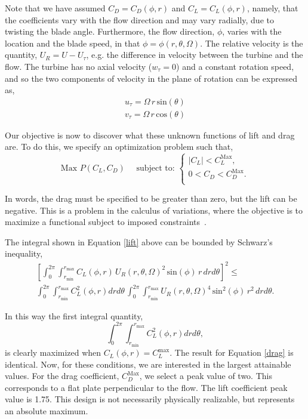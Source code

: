 Note that we have assumed $C_D = C_D(\phi,r)$ and $C_L = C_L(\phi,r)$,
namely, that the coefficients vary with the flow direction and may vary
radially, due to twisting the blade angle. Furthermore, the flow
direction, $\phi$, varies with the location and the blade speed,
in that $\phi=\phi(r,\theta,\Omega)$. The relative velocity is the
quantity, $U_R = U - U_\tau$, e.g. the difference in velocity between
the turbine and the flow. The turbine has no axial velocity ($w_\tau =
0$) and a constant rotation speed, and so the two components of velocity
in the plane of rotation can be expressed as,
\begin{align}
 u_\tau = \Omega \,r\, \text{sin}(\theta)\\
 v_\tau = \Omega \,r\, \text{cos}(\theta)
\end{align}

Our objective is now to discover what these unknown functions of lift
and drag are. To do this, we specify an optimization problem such that, 
\begin{equation*} 
 \text{Max } P(C_L,C_D) \quad \text{ subject to: }
  \begin{cases}
   |C_L| < C_L^{\text{Max}}, \\
   0 < C_D < C_D^{\text{Max}}. \\
  \end{cases}
\end{equation*}

In words, the drag must be specified to be greater than zero, but
the lift can be negative. This is a problem in the calculus of
variations, where the objective is to maximize a
functional subject to imposed
constraints~\cite{thornton2004classical,bradbury1968theoretical,2015JFM...784..565S}.   

%
%
The integral shown in Equation \ref{lift} above can be bounded by 
Schwarz's inequality,  
\begin{align*}
  \left[
    \int_0^{2\pi}
    \int_{r_{\text{min}}}^{r_{\text{max}}} C_L(\phi,r)\, U_R(r,\theta,\Omega)^2
 \,\text{sin}(\phi)\, r\,dr d\theta \right]^2 \le \\
  \int_0^{2\pi} \int_{r_{\text{min}}}^{r_{\text{max}}} C_L^2(\phi,r) dr d\theta\,
  \int_0^{2\pi} \int_{r_{\text{min}}}^{r_{\text{max}}} U_R(r,\theta,\Omega)^4 
 \,\text{sin}^2(\phi)\, r^2\,dr d\theta.
\end{align*}

In this way the first integral quantity,
\begin{equation}
  \int_0^{2\pi}
 \int_{r_{\text{min}}}^{r_{\text{max}}} C_L^2(\phi,r) dr d\theta, 
\end{equation}
is clearly maximized when $C_L(\phi,r) = C_L^{\text{max}}$. 
The result for Equation \ref{drag} is identical. Now, for these
conditions, we are interested in the largest attainable values. For the drag
coefficient, $C_D^{\text{Max}}$, we select a peak value of two. %
This corresponds to a flat plate perpendicular to the flow.
The lift coefficient peak value is 1.75. This design is not necessarily
physically realizable, but represents an absolute maximum. 

